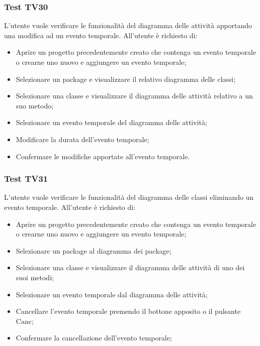 \documentclass[../PianoDiQualifica.tex]{subfiles}
\begin{document}
	\subsubsection{Test TV30} 
	L'utente vuole verificare le funzionalità del diagramma delle attività apportando una modifica ad un evento temporale. 
	All'utente è richiesto di: 
	\begin{itemize} 
		\item Aprire un progetto precedentemente creato che contenga un evento temporale o crearne uno nuovo e aggiungere un evento temporale;
		\item Selezionare un package e visualizzare il relativo diagramma delle classi; 
		\item Selezionare una classe e visualizzare il diagramma delle attività relativo a un suo metodo; 
		\item Selezionare un evento temporale del diagramma delle attività;
		\item Modificare la durata dell'evento temporale; 
		\item Confermare le modifiche apportate all'evento temporale. 
	\end{itemize} 
	
	
	\subsubsection{Test TV31} 
	L'utente vuole verificare le funzionalità del diagramma delle classi eliminando un evento temporale. 
	All'utente è richiesto di: 
	\begin{itemize} 
		\item Aprire un progetto precedentemente creato che contenga un evento temporale o crearne uno nuovo e aggiungere un evento temporale;
		\item Selezionare un package al diagramma dei package; 
		\item Selezionare una classe e visualizzare il diagramma delle attività di uno dei suoi metodi; 
		\item Selezionare un evento temporale dal diagramma delle attività; 
		\item Cancellare l'evento temporale premendo il bottone apposito o il pulsante Canc; 
		\item Confermare la cancellazione dell'evento temporale; 
	\end{itemize} 
	
	
	
\end{document}
